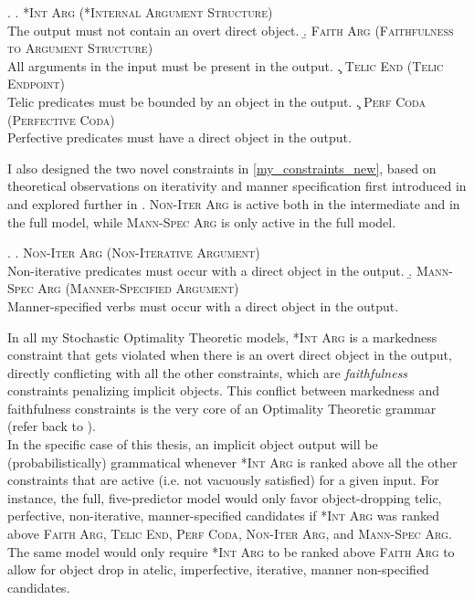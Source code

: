 \ex. \label{my_constraints_medina} 
\a. \label{my_constraints_intarg} \textsc{*Int Arg (*Internal Argument Structure)}\\ The output must not contain an overt direct object.
\b. \label{my_constraints_faith} \textsc{Faith Arg (Faithfulness to Argument Structure)}\\ All arguments in the input must be present in the output.
\c. \label{my_constraints_telic} \textsc{Telic End (Telic Endpoint)}\\ Telic predicates must be bounded by an object in the output.
\c. \label{my_constraints_perf} \textsc{Perf Coda (Perfective Coda)}\\ Perfective predicates must have a direct object in the output.

I also designed the two novel constraints in \ref{my_constraints_new}, based on theoretical observations on iterativity and manner specification first introduced in  and explored further in . \textsc{Non-Iter Arg} is active both in the intermediate and in the full model, while \textsc{Mann-Spec Arg} is only active in the full model.

\ex. \label{my_constraints_new} 
\a. \label{my_constraints_iter} \textsc{Non-Iter Arg (Non-Iterative Argument)}\\ Non-iterative predicates must occur with a direct object in the output.
\b. \label{my_constraints_spec} \textsc{Mann-Spec Arg (Manner-Specified Argument)}\\ Manner-specified verbs must occur with a direct object in the output.

In all my Stochastic Optimality Theoretic models, \textsc{*Int Arg} is a markedness constraint that gets violated when there is an overt direct object in the output, directly conflicting with all the other constraints, which are \textit{faithfulness} constraints penalizing implicit objects. This conflict between markedness and faithfulness constraints is the very core of an Optimality Theoretic grammar (refer back to ).\\
In the specific case of this thesis, an implicit object output will be (probabilistically) grammatical whenever \textsc{*Int Arg} is ranked above all the other constraints that are active (i.e. not vacuously satisfied) for a given input. For instance, the full, five-predictor model would only favor object-dropping telic, perfective, non-iterative, manner-specified candidates if \textsc{*Int Arg} was ranked above \textsc{Faith Arg}, \textsc{Telic End}, \textsc{Perf Coda}, \textsc{Non-Iter Arg}, and \textsc{Mann-Spec Arg}. The same model would only require \textsc{*Int Arg} to be ranked above \textsc{Faith Arg} to allow for object drop in atelic, imperfective, iterative, manner non-specified candidates.

